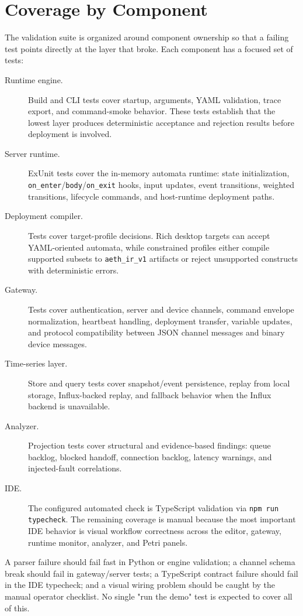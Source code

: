 \section{Coverage by Component}

The validation suite is organized around component ownership so that a failing test points directly at the layer that broke. Each component has a focused set of tests:

\begin{description}
  \item[Runtime engine.] Build and CLI tests cover startup, arguments, YAML validation, trace export, and command-smoke behavior. These tests establish that the lowest layer produces deterministic acceptance and rejection results before deployment is involved.
  \item[Server runtime.] ExUnit tests cover the in-memory automata runtime: state initialization, \texttt{on\_enter}/\texttt{body}/\texttt{on\_exit} hooks, input updates, event transitions, weighted transitions, lifecycle commands, and host-runtime deployment paths.
  \item[Deployment compiler.] Tests cover target-profile decisions. Rich desktop targets can accept YAML-oriented automata, while constrained profiles either compile supported subsets to \texttt{aeth\_ir\_v1} artifacts or reject unsupported constructs with deterministic errors.
  \item[Gateway.] Tests cover authentication, server and device channels, command envelope normalization, heartbeat handling, deployment transfer, variable updates, and protocol compatibility between JSON channel messages and binary device messages.
  \item[Time-series layer.] Store and query tests cover snapshot/event persistence, replay from local storage, Influx-backed replay, and fallback behavior when the Influx backend is unavailable.
  \item[Analyzer.] Projection tests cover structural and evidence-based findings: queue backlog, blocked handoff, connection backlog, latency warnings, and injected-fault correlations.
  \item[IDE.] The configured automated check is TypeScript validation via \texttt{npm run typecheck}. The remaining coverage is manual because the most important IDE behavior is visual workflow correctness across the editor, gateway, runtime monitor, analyzer, and Petri panels.
\end{description}

A parser failure should fail fast in Python or engine validation; a channel schema break should fail in gateway/server tests; a TypeScript contract failure should fail in the IDE typecheck; and a visual wiring problem should be caught by the manual operator checklist. No single "run the demo" test is expected to cover all of this.


